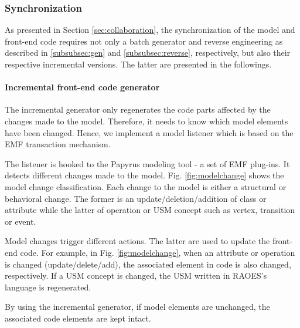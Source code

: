 \noindent
\subsubsection{Synchronization}
As presented in Section \ref{sec:collaboration}, the synchronization of the model and front-end code requires not only a batch generator and reverse engineering as described in \ref{subsubsec:gen} and \ref{subsubsec:reverse}, respectively, but also their respective incremental versions.
The latter are presented in the followings.
 
\noindent
\paragraph{Incremental front-end code generator}
The incremental generator only regenerates the code parts affected by the changes made to the model.
Therefore, it needs to know which model elements have been changed.
Hence, we implement a model listener which is based on the EMF transaction mechanism.

The listener is hooked to the Papyrus modeling tool - a set of EMF plug-ins.
It detects different changes made to the model.
Fig. \ref{fig:modelchange} shows the model change classification. 
Each change to the model is either a structural or behavioral change.
The former is an update/deletion/addition of class or attribute while the latter of operation or USM concept such as vertex, transition or event. 

Model changes trigger different actions.
The latter are used to update the front-end code.
For example, in Fig. \ref{fig:modelchange}, when an attribute or operation is changed (update/delete/add), the associated element in code is also changed, respectively.
If a USM concept is changed, the USM written in RAOES's language is regenerated.

By using the incremental generator, if model elements are unchanged, the associated code elements are kept intact.


